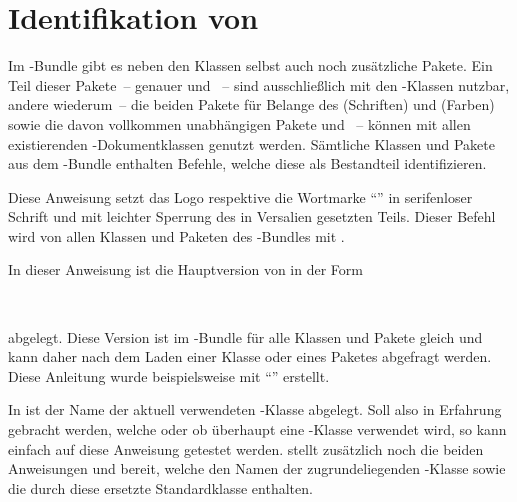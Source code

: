 \chapter{Identifikation von \TUDScript}
Im \TUDScript-Bundle gibt es neben den Klassen selbst auch noch zusätzliche 
Pakete. Ein Teil dieser Pakete~-- genauer  und 
~-- sind ausschließlich mit den \TUDScript-Klassen nutzbar, 
andere wiederum~-- die beiden Pakete für Belange des \CDs {} 
(Schriften) und  (Farben) sowie die davon vollkommen 
unabhängigen Pakete  und ~-- können mit 
allen existierenden -Dokumentklassen genutzt werden. Sämtliche 
Klassen und Pakete aus dem \TUDScript-Bundle enthalten Befehle, welche diese 
als Bestandteil identifizieren.

\begin{Declaration}[v2.04]{}
\printdeclarationlist%
%
Diese Anweisung setzt das Logo respektive die Wortmarke \enquote{\TUDScript{}} 
in serifenloser Schrift und mit leichter Sperrung des in Versalien gesetzten 
Teils. Dieser Befehl wird von allen Klassen und Paketen des \TUDScript-Bundles 
mit .
\end{Declaration}

\begin{Declaration}[v2.04]{}
\printdeclarationlist%
%
In dieser Anweisung ist die Hauptversion von \TUDScript in der Form
\begin{quoting}
~~
\end{quoting}
abgelegt. Diese Version ist im \TUDScript-Bundle für alle Klassen und Pakete 
gleich und kann daher nach dem Laden einer Klasse oder eines Paketes abgefragt 
werden. Diese Anleitung wurde beispielsweise mit \enquote{\TUDVersion{}} 
erstellt.
\end{Declaration}

\begin{Declaration}[v2.04]{}
\printdeclarationlist%
%
In  ist der Name der aktuell verwendeten \TUDScript-Klasse 
abgelegt. Soll also in Erfahrung gebracht werden, welche oder ob überhaupt eine 
\TUDScript-Klasse verwendet wird, so kann einfach auf diese Anweisung getestet 
werden. \KOMAScript{} stellt zusätzlich noch die beiden Anweisungen 
 und  bereit, welche den Namen der 
zugrundeliegenden \KOMAScript-Klasse sowie die durch diese ersetzte 
Standardklasse enthalten.
\end{Declaration}
